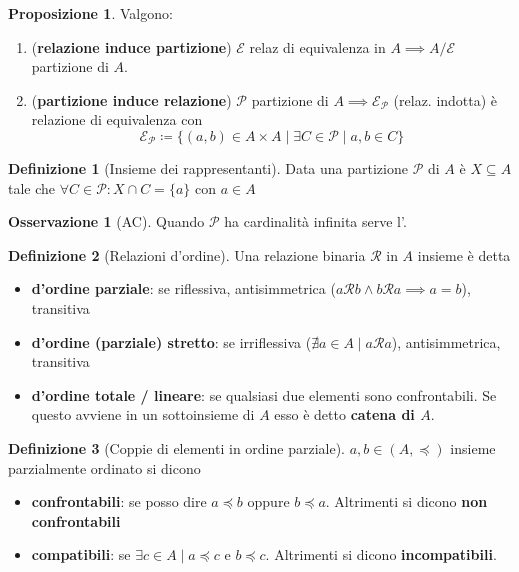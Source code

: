 \documentclass[a4paper,10pt]{article}
\theoremstyle{definition}
\newcommand{\noun}[1]{\textsc{#1}}
\theoremstyle{indentdefinition}
\newtheorem{defn}{Definizione}[section]
\theoremstyle{indentpostulate}
\theoremstyle{indenttheorem}
\newtheorem{prop}{Proposizione}[section]
\theoremstyle{myremark}
\newtheorem*{rem*}{Osservazione}
\theoremstyle{indentgeneral}
\begin{document}
\begin{prop} Valgono:
\begin{enumerate}
    \item (\textbf{relazione induce partizione}) $\mathscr{E}$ relaz di equivalenza in $A\implies A/\mathscr{E}$ partizione di $A$.
    \item (\textbf{partizione induce relazione}) $\mathscr{P}$ partizione di $A\implies\mathscr{E}_{\mathscr{P}}$ (relaz. indotta) è relazione di equivalenza con
    $$\mathscr{E}_{\mathscr{P}}\coloneqq \{(a,b)\in A\times A \mid \exists C\in\mathscr{P}\mid a,b\in C \}$$
\end{enumerate}
\end{prop}

\begin{defn}[Insieme dei rappresentanti]
    Data una partizione $\mathscr{P}$ di $A$ è $X\subseteq A$ tale che $\forall C\in \mathscr{P}: X\cap C=\{a\}$ con $a\in A$
\end{defn}

\begin{rem*}[\noun{AC}]
    Quando $\mathscr{P}$ ha cardinalità infinita serve l'.
\end{rem*}

\begin{defn}[Relazioni d'ordine]
    Una relazione binaria $\mathscr{R}$ in $A$ insieme è detta 
    \begin{itemize}
        \item \textbf{d'ordine parziale}: se riflessiva, antisimmetrica ($a\mathscr{R}b\land b\mathscr{R}a\implies a=b$), transitiva
        \item \textbf{d'ordine (parziale) stretto}: se irriflessiva ($\nexists a\in A \mid a\mathscr{R}a$), antisimmetrica, transitiva
        \item \textbf{d'ordine totale / lineare}: se qualsiasi due elementi sono confrontabili. Se questo avviene in un sottoinsieme di $A$ esso è detto \textbf{catena di $A$}.
    \end{itemize}
\end{defn}

\begin{defn}[Coppie di elementi in ordine parziale] $a,b\in (A,\preceq)$ insieme parzialmente ordinato si dicono
\begin{itemize}
    \item \textbf{confrontabili}: se posso dire $a\preceq b$ oppure $b\preceq a$. Altrimenti si dicono \textbf{non confrontabili}
    \item \textbf{compatibili}: se $\exists c\in A\mid a\preceq c$ e $b\preceq c$. Altrimenti si dicono \textbf{incompatibili}.
\end{itemize}
    
\end{defn}
\end{document}
